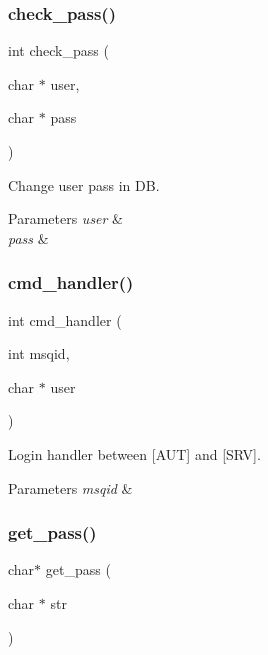 \subsubsection{check\+\_\+pass()}
{\footnotesize\ttfamily int check\+\_\+pass (\begin{DoxyParamCaption}\item[{char $\ast$}]{user,  }\item[{char $\ast$}]{pass }\end{DoxyParamCaption})}



Change user pass in DB. 


\begin{DoxyParams}{Parameters}
{\em user} & \\
\hline
{\em pass} & \\
\hline
\end{DoxyParams}
\mbox{\label{auth_8h_ac577f045e4bf8abe2128eb727bf5edb7}} 
\subsubsection{cmd\+\_\+handler()}
{\footnotesize\ttfamily int cmd\+\_\+handler (\begin{DoxyParamCaption}\item[{int}]{msqid,  }\item[{char $\ast$}]{user }\end{DoxyParamCaption})}



Login handler between [A\+UT] and [S\+RV]. 


\begin{DoxyParams}{Parameters}
{\em msqid} & \\
\hline
\end{DoxyParams}
\mbox{\label{auth_8h_ab699bd210dfe5219d858aeb212650f47}} 
\subsubsection{get\+\_\+pass()}
{\footnotesize\ttfamily char$\ast$ get\+\_\+pass (\begin{DoxyParamCaption}\item[{char $\ast$}]{str }\end{DoxyParamCaption})}



